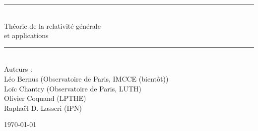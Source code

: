 \documentclass[french]{book} %
\newcommand{\HRule}{\rule{\linewidth}{0.5mm}}
\theoremstyle{plain}
\begin{document}




	\begin{titlepage}

	\begin{center}





	\begin{center}

	\end{center}








	\HRule \\[0.8cm]
	{\huge  Théorie de la relativité générale \\ et applications }\\[0.4cm]
	\HRule \\[1cm]

	Auteurs : \\

	Léo Bernus (Observatoire de Paris, IMCCE (bientôt)) \\
	Loïc Chantry (Observatoire de Paris, LUTH) \\
	Olivier Coquand (LPTHE) \\
	Raphaël D. Lasseri (IPN)




	{\large   \today }






	\vfill



	\end{center}

	\end{titlepage}
\end{document}

